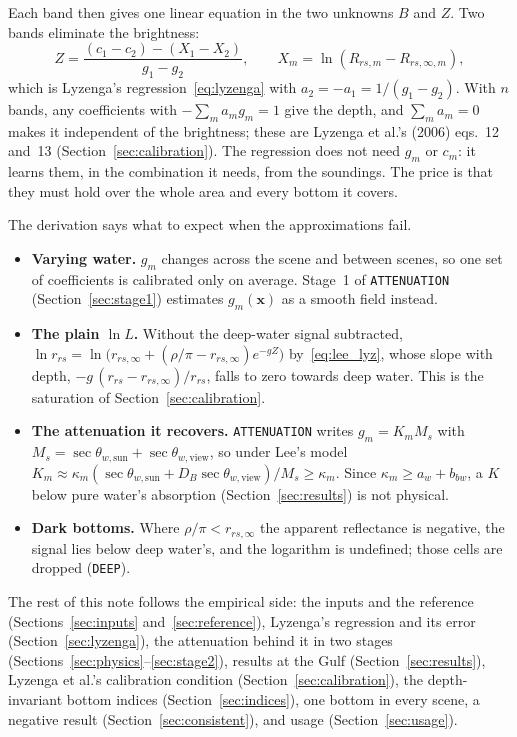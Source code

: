 \documentclass[11pt]{article}
\numberwithin{equation}{section}
\newcommand{\bx}{\mathbf{x}}
\newcommand{\code}[1]{\texttt{#1}}
\begin{document}
Each band then gives one linear equation in the two unknowns $B$ and $Z$. Two bands eliminate the
brightness:
\begin{equation}
  Z = \frac{(c_1 - c_2) - (X_1 - X_2)}{g_1 - g_2} ,
  \qquad X_m = \ln(R_{rs,m} - R_{rs,\infty,m}),
\end{equation}
which is Lyzenga's regression~\eqref{eq:lyzenga} with $a_2 = -a_1 = 1/(g_1 - g_2)$. With $n$ bands,
any coefficients with $-\sum_m a_m g_m = 1$ give the depth, and $\sum_m a_m = 0$ makes it
independent of the brightness; these are Lyzenga et al.'s (2006) eqs.~12 and~13
(Section~\ref{sec:calibration}). The regression does not need $g_m$ or $c_m$: it learns them, in
the combination it needs, from the soundings. The price is that they must hold over the whole
area and every bottom it covers.

The derivation says what to expect when the approximations fail.
\begin{itemize}
\item \textbf{Varying water.} $g_m$ changes across the scene and between scenes, so one set of
  coefficients is calibrated only on average. Stage~1 of \code{ATTENUATION}
  (Section~\ref{sec:stage1}) estimates $g_m(\bx)$ as a smooth field instead.
\item \textbf{The plain $\ln L$.} Without the deep-water signal subtracted,
  $\ln r_{rs} = \ln\bigl(r_{rs,\infty} + (\rho/\pi - r_{rs,\infty})e^{-gZ}\bigr)$ by~\eqref{eq:lee_lyz},
  whose slope with depth, $-g\,(r_{rs} - r_{rs,\infty})/r_{rs}$, falls to zero towards deep water. This is
  the saturation of Section~\ref{sec:calibration}.
\item \textbf{The attenuation it recovers.} \code{ATTENUATION} writes $g_m = K_m M_s$ with
  $M_s = \sec\theta_{w,\mathrm{sun}} + \sec\theta_{w,\mathrm{view}}$, so under Lee's model
  $K_m \approx \kappa_m (\sec\theta_{w,\mathrm{sun}} + D_B \sec\theta_{w,\mathrm{view}})/M_s \ge \kappa_m$.
  Since $\kappa_m \ge a_w + b_{bw}$, a $K$ below pure water's absorption (Section~\ref{sec:results})
  is not physical.
\item \textbf{Dark bottoms.} Where $\rho/\pi < r_{rs,\infty}$ the apparent reflectance is negative,
  the signal lies below deep water's, and the logarithm is undefined; those cells are dropped
  (\code{DEEP}).
\end{itemize}

The rest of this note follows the empirical side: the inputs and the reference
(Sections~\ref{sec:inputs} and~\ref{sec:reference}), Lyzenga's regression and its error
(Section~\ref{sec:lyzenga}), the attenuation behind it in two stages
(Sections~\ref{sec:physics}--\ref{sec:stage2}), results at the Gulf (Section~\ref{sec:results}),
Lyzenga et al.'s calibration condition (Section~\ref{sec:calibration}), the depth-invariant bottom
indices (Section~\ref{sec:indices}), one bottom in every scene, a negative result
(Section~\ref{sec:consistent}), and usage (Section~\ref{sec:usage}).
\end{document}
